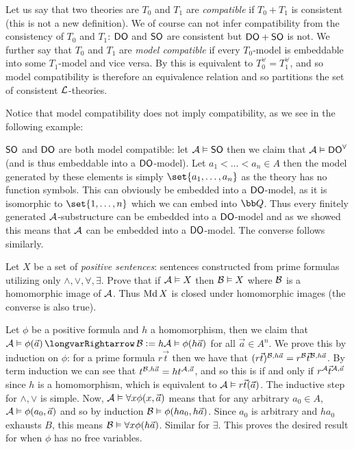 Let us say that two theories are $T_0$ and $T_1$ are {\it compatible} if $T_0+T_1$ is consistent (this is not a new definition).
We of course can not infer compatibility from the consistency of $T_0$ and $T_1$: ${\sf DO}$ and ${\sf SO}$ are consistent but ${\sf DO}+{\sf SO}$ is not.
We further say that $T_0$ and $T_1$ are {\it model compatible} if every $T_0$-model is embeddable into some $T_1$-model and vice versa.
By  this is equivalent to $T_0^\forall=T_1^\forall$, and so model compatibility is therefore an equivalence relation and so partitions the set of consistent
${\cal L}$-theories.

Notice that model compatibility does not imply compatibility, as we see in the following example:

\bexam

    ${\sf SO}$ and ${\sf DO}$ are both model compatible: let ${\cal A}\vDash{\sf SO}$ then we claim that ${\cal A}\vDash{\sf DO}^\forall$ (and is thus embeddable into a ${\sf DO}$-model).
    Let $a_1<\dots<a_n\in A$ then the model generated by these elements is simply $\set{a_1,\dots,a_n}$ as the theory has no function symbols.
    This can obviously be embedded into a ${\sf DO}$-model, as it is isomorphic to $\set{1,\dots,n}$ which we can embed into ${\bb Q}$.
    Thus every finitely generated ${\cal A}$-substructure can be embedded into a ${\sf DO}$-model and as we showed this means that ${\cal A}$ can be embedded into a ${\sf DO}$-model.
    The converse follows similarly.

\eexam

\bexerc

    Let $X$ be a set of {\it positive sentences}: sentences constructed from prime formulas utilizing only $\land,\lor,\forall,\exists$.
    Prove that if ${\cal A}\vDash X$ then ${\cal B}\vDash X$ where ${\cal B}$ is a homomorphic image of ${\cal A}$.
    Thus $\mathop{\rm Md} X$ is closed under homomorphic images (the converse is also true).

\eexerc

Let $\phi$ be a positive formula and $h$ a homomorphism, then we claim that ${\cal A}\vDash\phi(\vec a)\implies{\cal B}\coloneqq h{\cal A}\vDash\phi(h\vec a)$ for all $\vec a\in A^n$.
We prove this by induction on $\phi$: for a prime formula $r\vec t$ then we have that $(r\vec t)^{{\cal B},h\vec a}=r^{\cal B}\vec t^{{\cal B},h\vec a}$.
By term induction we can see that $t^{{\cal B},h\vec a}=ht^{{\cal A},\vec a}$, and so this is if and only if $r^{\cal A}\vec t^{{\cal A},\vec a}$ since $h$ is a homomorphism, which is equivalent to
${\cal A}\vDash r\vec t(\vec a)$.
The inductive step for $\land,\lor$ is simple.
Now, ${\cal A}\vDash\forall x\phi(x,\vec a)$ means that for any arbitrary $a_0\in A$, ${\cal A}\vDash\phi(a_0,\vec a)$ and so by induction ${\cal B}\vDash\phi(ha_0,h\vec a)$.
Since $a_0$ is arbitrary and $ha_0$ exhausts $B$, this means ${\cal B}\vDash\forall x\phi(h\vec a)$.
Similar for $\exists$.
This proves the desired result for when $\phi$ has no free variables.

